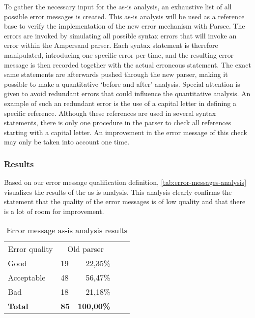 To gather the necessary input for the as-is analysis, an exhaustive list of all possible error messages is created.
This as-is analysis will be used as a reference base to verify the implementation of the new error mechanism with Parsec.
The errors are invoked by simulating all possible syntax errors that will invoke an error within the Ampersand parser.
Each syntax statement is therefore manipulated, introducing one specific error per time, and the resulting error message is then recorded together with the actual erroneous statement.
The exact same statements are afterwards pushed through the new parser, making it possible to make a quantitative `before and after' analysis.
Special attention is given to avoid redundant errors that could influence the quantitative analysis. 
An example of such an redundant error is the use of a capital letter in defining a specific reference. 
Although these references are used in several syntax statements, there is only one procedure in the parser to check all references starting with a capital letter.
An improvement in the error message of this check may only be taken into account one time.

\subsubsection{Results}
Based on our error message qualification definition, \autoref{tab:error-messages-analysis} visualizes the results of the as-is analysis.
This analysis clearly confirms the statement that the quality of the error messages is of low quality and that there is a lot of room for improvement.

\begin{table}[h]
  \centering
	\begin{tabular}{llrlr}
    Error quality  & \multicolumn{2}{c}{Old parser}     \\
		Good           & 19          & 22,35\%         \\
		Acceptable        & 48          & 56,47\%       \\
		Bad            & 18          & 21,18\%           \\
		\rowcolor[HTML]{BBBBBB}
		\textbf{Total} & \textbf{85} & \textbf{100,00\%} 
	\end{tabular}
  \caption{Error message as-is analysis results}
  \label{tab:error-messages-analysis}
\end{table}

